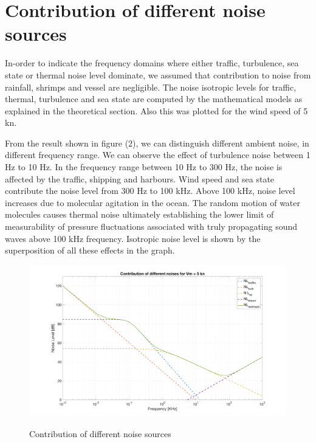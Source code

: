 \section{ Contribution of different noise sources } \label{ Contribution of different noise sources } 
\noindent In-order to indicate the frequency domains where either traffic, turbulence, sea state or thermal noise level dominate, we assumed that contribution to noise from rainfall, shrimps and vessel are negligible. The noise isotropic levels for traffic, thermal, turbulence and sea state are computed by the mathematical models as explained in the theoretical section.  Also this was plotted for the wind speed of 5 kn.

\noindent  From the result shown in figure (2), we can distinguish different ambient noise, in different frequency range. We can observe the effect of turbulence noise between 1 Hz to 10 Hz. In the frequency range between 10 Hz to 300 Hz, the noise is affected by the traffic, shipping and harbours. Wind speed and sea state contribute the noise level from 300 Hz to 100 kHz. Above 100 kHz, noise level increases due to molecular agitation in the ocean. The random motion of water molecules causes thermal noise ultimately establishing the lower limit of measurability of pressure fluctuations associated with truly propagating sound waves above 100 kHz frequency. Isotropic noise level is shown by the superposition of all these effects in the graph. 

\begin{figure}[H]
\centering
{\includegraphics[scale=0.18]{usp4_2.png}}
\caption{ Contribution of different noise sources }
\end{figure}

